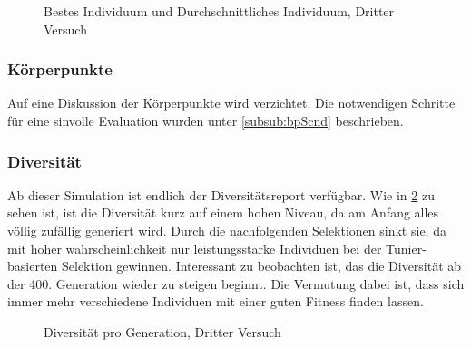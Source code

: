         \begin{figure}
          
          \caption{Bestes Individuum und Durchschnittliches Individuum, Dritter Versuch\label{fig:graphThird}}
        \end{figure}

        \subsubsection{Körperpunkte}

          Auf eine Diskussion der Körperpunkte wird verzichtet.
          Die notwendigen Schritte für eine sinvolle Evaluation wurden unter \ref{subsub:bpScnd} beschrieben.

        \subsubsection{Diversität}
          Ab dieser Simulation ist endlich der Diversitätsreport verfügbar. Wie in \ref{fig:graphDivThird} zu sehen ist,
          ist die Diversität kurz auf einem hohen Niveau, da am Anfang alles völlig zufällig generiert wird.
          Durch die nachfolgenden Selektionen sinkt sie, da mit hoher wahrscheinlichkeit nur leistungsstarke Individuen
          bei der Tunier-basierten Selektion gewinnen. Interessant zu beobachten ist,
          das die Diversität ab der 400. Generation wieder zu steigen beginnt.
          Die Vermutung dabei ist, dass sich immer mehr verschiedene Individuen mit einer
          guten Fitness finden lassen.
        \begin{figure}
          
          \caption{Diversität pro Generation, Dritter Versuch\label{fig:graphDivThird}}
        \end{figure}
